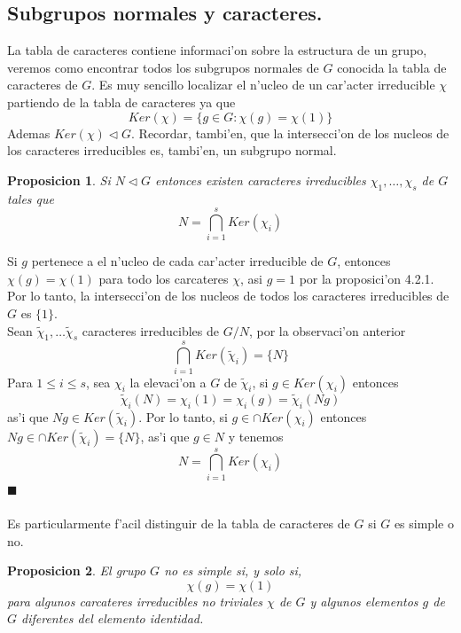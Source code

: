 \documentclass[a4paper,openright,12pt]{book}
\numberwithin{equation}{section} %
\newtheorem{proposicion}{Proposicion}[section] %
\newenvironment{proof}{\noindent{\it Demostracion:}}{\hfill$\blacksquare$} %
\begin{document}
\subsection{Subgrupos normales y caracteres.}
La tabla de caracteres contiene informaci'on sobre la estructura de un grupo, veremos como encontrar todos los subgrupos normales de $G$ conocida la tabla de caracteres de $G$. Es muy sencillo localizar el n'ucleo de un car'acter irreducible $\chi$ partiendo de la tabla de caracteres ya que
\[
Ker (\chi) = \{ g \in G : \chi (g) = \chi (1) \}
\] 
Ademas $Ker (\chi) \triangleleft G$. Recordar, tambi'en, que la intersecci'on de los nucleos de los caracteres irreducibles es, tambi'en, un subgrupo normal.
\begin{proposicion}
Si $N \triangleleft G$ entonces existen caracteres irreducibles $\chi_{1}, \ldots ,\chi_{s}$ de $G$ tales que
\[
N=\bigcap_{i=1}^{s}Ker(\chi_{i})
\]
\end{proposicion} 
\begin{proof}
Si $g$ pertenece a el n'ucleo de cada car'acter irreducible de $G$, entonces $\chi (g) = \chi (1)$ para todo los carcateres $\chi$, asi $g=1$ por la proposici'on 4.2.1. Por lo tanto, la intersecci'on de los nucleos de todos los caracteres irreducibles de $G$ es $\{1\}$.\\
Sean $\tilde \chi_{1}, \ldots \tilde \chi_{s}$ caracteres irreducibles de $G/N$, por la observaci'on anterior 
\[
\bigcap_{i=1}^{s}Ker(\tilde \chi_{i})= \{N\}
\]
Para $1 \leq i \leq s$, sea $\chi_{i}$ la elevaci'on a $G$ de $\tilde \chi_{i}$, si $g \in Ker (\chi_{i})$ entonces
\[
\tilde \chi_{i}(N)=\chi_{i}(1)=\chi_{i}(g)= \tilde \chi_{i}(Ng)
\] 
as'i que $Ng \in Ker (\tilde \chi_{i})$. Por lo tanto, si $g \in \cap Ker (\chi_{i})$ entonces $Ng \in \cap Ker (\tilde \chi_{i})=\{ N \}$, as'i que $g \in N$ y tenemos 
\[
N=\bigcap_{i=1}^{s}Ker(\chi_{i})
\]
\end{proof}\\
\\
Es particularmente f'acil distinguir de la tabla de caracteres de $G$ si $G$ es simple o no.
\begin{proposicion}
El grupo $G$ no es simple si, y solo si, 
\[
\chi (g) = \chi (1)
\]
para algunos carcateres irreducibles no triviales $\chi$ de $G$ y algunos elementos $g$ de $G$ diferentes del elemento identidad.
\end{proposicion}
\end{document}
